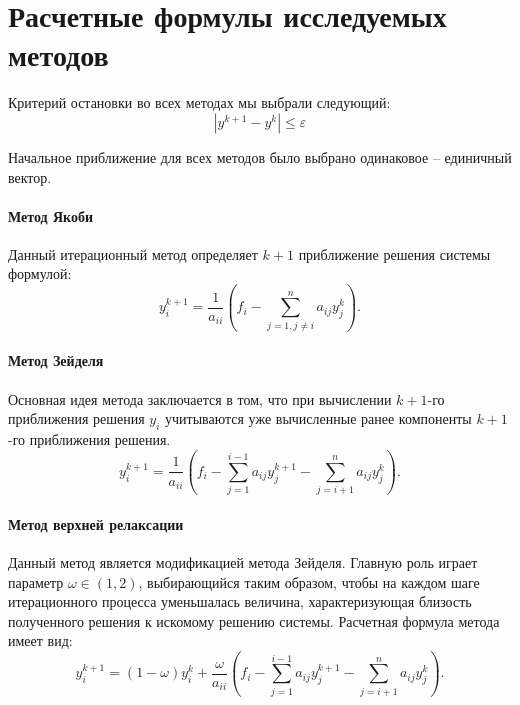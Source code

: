 \section{Расчетные формулы исследуемых методов}
Критерий остановки во всех методах мы выбрали следующий:
\begin{equation}
	\left| y^{k+1} - y^k \right| \leq \varepsilon
\end{equation}

Начальное приближение для всех методов было выбрано одинаковое -- единичный вектор.

\paragraph{Метод Якоби}
Данный итерационный метод определяет $k+1$ приближение решения системы формулой:
\begin{equation}
	y^{k+1}_i = \frac{1}{a_{i i}}\left(f_i - \sum^n_{j=1, j \neq i} a_{i j}y^k_j \right).
\end{equation}

\paragraph{Метод Зейделя}
Основная идея метода заключается в том, что при вычислении $k+1$-го приближения решения $y_i$ учитываются уже вычисленные ранее компоненты $k+1$-го приближения решения.
\begin{equation}
	y^{k+1}_i = \frac{1}{a_{i i}}\left(f_i - \sum^{i-1}_{j=1} a_{i j}y^{k+1}_j - \sum^n_{j=i+1} a_{i j}y^k_j \right).
\end{equation}

\paragraph{Метод верхней релаксации}
Данный метод является модификацией метода Зейделя. Главную роль играет параметр $\omega \in (1, 2)$, выбирающийся таким образом, чтобы на каждом шаге итерационного процесса уменьшалась величина, характеризующая близость полученного решения к искомому решению системы. Расчетная формула метода имеет вид:
\begin{equation}
	y^{k+1}_i = (1-\omega)y^k_i+\frac{\omega}{a_{i i}}\left(f_i - \sum^{i-1}_{j=1} a_{i j}y^{k+1}_j - \sum^n_{j=i+1} a_{i j}y^k_j \right).
\end{equation}

